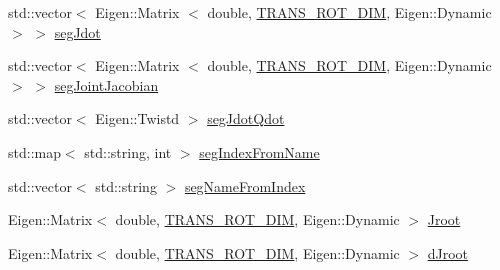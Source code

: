 \begin{DoxyCompactItemize}
\item 
std\-::vector$<$ \-Eigen\-::\-Matrix\*
$<$ double, \hyperlink{OcraWbiModel_8cpp_ab4a87cb824ceff256c6b8bce7701af58}{\-T\-R\-A\-N\-S\-\_\-\-R\-O\-T\-\_\-\-D\-I\-M}, \*
\-Eigen\-::\-Dynamic $>$ $>$ \hyperlink{structOcraWbiModel_1_1OcraWbiModel__pimpl_ab0371f4015f7abdf795636003e302de1}{seg\-Jdot}
\item 
std\-::vector$<$ \-Eigen\-::\-Matrix\*
$<$ double, \hyperlink{OcraWbiModel_8cpp_ab4a87cb824ceff256c6b8bce7701af58}{\-T\-R\-A\-N\-S\-\_\-\-R\-O\-T\-\_\-\-D\-I\-M}, \*
\-Eigen\-::\-Dynamic $>$ $>$ \hyperlink{structOcraWbiModel_1_1OcraWbiModel__pimpl_a4e1b970fc381b8c93bb41e4b3854986c}{seg\-Joint\-Jacobian}
\item 
std\-::vector$<$ \-Eigen\-::\-Twistd $>$ \hyperlink{structOcraWbiModel_1_1OcraWbiModel__pimpl_aa8c16d833a534ce9975a10202aa145a3}{seg\-Jdot\-Qdot}
\item 
std\-::map$<$ std\-::string, int $>$ \hyperlink{structOcraWbiModel_1_1OcraWbiModel__pimpl_ad172a7f70ea862fa849e859dc3c8e4f1}{seg\-Index\-From\-Name}
\item 
std\-::vector$<$ std\-::string $>$ \hyperlink{structOcraWbiModel_1_1OcraWbiModel__pimpl_ad1592df54a2ce8043dc2bc050fd61905}{seg\-Name\-From\-Index}
\item 
\-Eigen\-::\-Matrix$<$ double, \*
\hyperlink{OcraWbiModel_8cpp_ab4a87cb824ceff256c6b8bce7701af58}{\-T\-R\-A\-N\-S\-\_\-\-R\-O\-T\-\_\-\-D\-I\-M}, \-Eigen\-::\-Dynamic $>$ \hyperlink{structOcraWbiModel_1_1OcraWbiModel__pimpl_a4a70bcc50b618443daf9fed6f5303403}{\-Jroot}
\item 
\-Eigen\-::\-Matrix$<$ double, \*
\hyperlink{OcraWbiModel_8cpp_ab4a87cb824ceff256c6b8bce7701af58}{\-T\-R\-A\-N\-S\-\_\-\-R\-O\-T\-\_\-\-D\-I\-M}, \-Eigen\-::\-Dynamic $>$ \hyperlink{structOcraWbiModel_1_1OcraWbiModel__pimpl_afaba1181f7d08272208e372e2e23106c}{d\-Jroot}
\end{DoxyCompactItemize}


